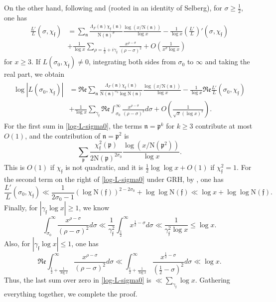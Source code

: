 \documentclass[11pt]{amsart}
\def\p{\mathfrak{p}}
\def\n{\mathfrak{n}}
\newcommand{\norm}{\mathrm{N}}
\numberwithin{equation}{section}
\renewcommand{\Re}{{\mathfrak{Re}}}
\theoremstyle{remark}
\begin{document}
On the other hand, following  \cite[Eq. (11)]{RaSo} and \cite[Lemma 14]{So} (rooted in an identity of Selberg),  for $\sigma\ge\frac{1}{2}$, one has
\begin{align*}
 \frac{L'}{L}(\sigma,\chi_\mathfrak{f})
 &=\sum_{\n} \frac{\Lambda_F(\n) \chi_\mathfrak{f}(\n)}{\norm(\n)^{\sigma} } \frac{\log (x/\norm(\n))}{\log x}
-\frac{1}{\log x}\left(\frac{L'}{L}\right)'(\sigma,\chi_\mathfrak{f})\\
&+\frac{1}{\log x} \sum_{\rho =\frac{1}{2}+i\gamma_\mathfrak{f}} \frac{x^{\rho-\sigma}}{(\rho-\sigma)^2} 
+O\left( \frac{1}{x^{\sigma} \log x}\right)
\end{align*}
for $x\ge 3$. If $L(\sigma_0 , \chi_\mathfrak{f})\neq 0$, integrating both sides from $\sigma_0$ to $\infty$ and taking the real part, we obtain
\begin{align}\label{log-L-sigma0}
 \begin{split}
\log |L(\sigma_0 ,\chi_\mathfrak{f})|
& =
\Re \sum_{\n} \frac{\Lambda_F(\n) \chi_\mathfrak{f}(\n)}{\norm(\n)^{\sigma_0} \log \norm(\n)} \frac{\log (x/\norm(\n))}{\log x}
-\frac{1}{\log x}\Re \frac{L'}{L}(\sigma_0, \chi_\mathfrak{f})\\
&+\frac{1}{\log x}\sum_{\gamma_\mathfrak{f}} \Re \int_{\sigma_0}^\infty \frac{x^{\rho-\sigma}}{(\rho-\sigma)^2}d\sigma 
+O\left( \frac{1}{ \sqrt{x} (\log x)^2}\right).
  \end{split}
\end{align}
For the first sum in \eqref{log-L-sigma0}, the terms $\n= \p^k$ for $k\ge 3$ contribute at most $O(1)$, and the contribution of $\n= \p^2$ is
$$
\sum_{\p} \frac{ \chi_\mathfrak{f}^2(\p)}{2\norm(\p)^{2\sigma_0} } \frac{\log (x/\norm(\p^2))}{\log x}.
$$
This is $O(1)$ if $\chi_\mathfrak{f}$ is not quadratic, and it is
$
\frac{1}{2}\log\log x +O(1)
$
if $\chi_\mathfrak{f}^2 =1$.
For the second term on the right of \eqref{log-L-sigma0} under GRH, by \cite[Theorem 5.17]{IK}, one has 
$$
\frac{L'}{L}(\sigma_0,\chi_\mathfrak{f})
\ll \frac{1}{2\sigma_0 -1}  (\log \norm(\mathfrak{f}))^{2-2\sigma_0  }  + \log\log  \norm(\mathfrak{f})
\ll \log x +\log\log \norm(\mathfrak{f}).
$$
Finally, for $|\gamma_\mathfrak{f}\log x |\ge 1$, we know
$$
 \int_{\sigma_0}^{\infty} \frac{x^{\rho -\sigma}}{(\rho-\sigma)^2} d\sigma
\ll \frac{1}{\gamma_\mathfrak{f}^2}  \int_{\frac{1}{2}}^{\infty} x^{\frac{1}{2} -\sigma} d\sigma
\ll \frac{1}{\gamma_\mathfrak{f}^2 \log x}
\le  \log x.  
$$
Also, for  $|\gamma_\mathfrak{f}\log x |\le 1$, one has
$$
\Re \int_{\frac{1}{2} +\frac{1}{\log x}}^{\infty} \frac{x^{\rho -\sigma}}{(\rho -\sigma)^2} d\sigma 
\ll   \int_{\frac{1}{2} +\frac{1}{\log x}}^{\infty} \frac{ x^{\frac{1}{2} -\sigma} }{(\frac{1}{2} -\sigma)^2} d\sigma \ll \log x.
$$
Thus, the last sum over zero in \eqref{log-L-sigma0} is $\ll \sum_{\gamma_\mathfrak{f}} \log x.$ Gathering everything together, we complete the proof.
\end{document}
